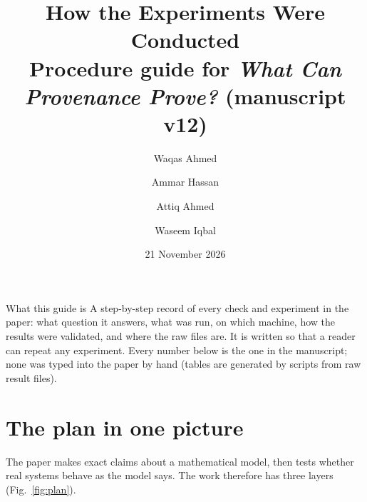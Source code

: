 
\title{\sffamily\bfseries How the Experiments Were Conducted\\[2pt]
\large\mdseries Procedure guide for \emph{What Can Provenance Prove?} (manuscript v12)}
\author{Waqas Ahmed \and Ammar Hassan \and Attiq Ahmed \and Waseem Iqbal}
\date{21 November 2026}

\sloppy
\maketitle

\begin{keypoint}{What this guide is}
A step-by-step record of every check and experiment in the paper: what question it answers,
what was run, on which machine, how the results were validated, and where the raw files are.
It is written so that a reader can repeat any experiment. Every number below is the one in the
manuscript; none was typed into the paper by hand (tables are generated by scripts from raw
result files).
\end{keypoint}

\tableofcontents

\section{The plan in one picture}

The paper makes exact claims about a mathematical model, then tests whether real systems
behave as the model says. The work therefore has three layers (Fig.~\ref{fig:plan}).

